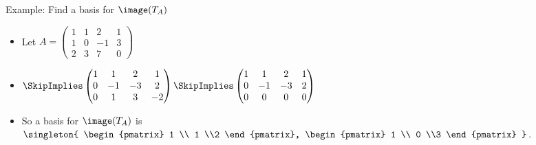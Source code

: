 \documentclass{beamer}
\begin{document}
\begin{frame}{Example: Find a basis for $\image(T_A)$}

\begin{itemize}
\item Let $A=
\begin{pmatrix}
1 & 1 & 2 & 1  \\
1 & 0 & -1 & 3  \\
2 & 3 & 7 & 0
\end{pmatrix}
$
\item $
\SkipImplies
\begin{pmatrix}
1 & 1 & 2 & 1 \\
0 & -1 & -3 & 2  \\
0 & 1 & 3 & -2
\end{pmatrix}
\SkipImplies
\begin{pmatrix}
1 & 1 & 2 & 1  \\
0 & -1 & -3 & 2 \\
0 & 0 & 0 & 0
\end{pmatrix}
$
\item So a basis for $\image(T_A)$ is
$\singleton{
\begin{pmatrix}
1 \\ 1 \\2
\end{pmatrix},
\begin{pmatrix}
1 \\ 0 \\3
\end{pmatrix}
}$.
\end{itemize}

\end{frame}

\end{document}
